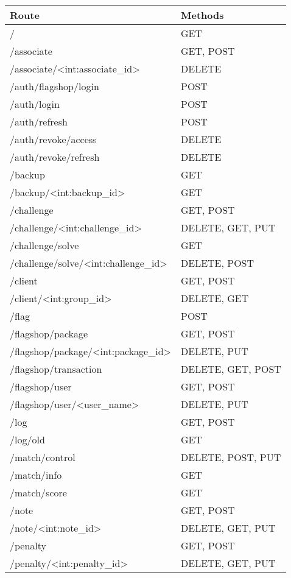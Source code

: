 \begin{table}
	\centering
	\begin{tabular}{l l}
		Route									 & Methods \\ [0.5ex]
		\hline
		/										 & GET \\
		/associate								 & GET, POST \\
		/associate/<int:associate\_id>			 & DELETE \\
		/auth/flagshop/login					 & POST \\
		/auth/login								 & POST \\
		/auth/refresh							 & POST \\
		/auth/revoke/access						 & DELETE \\
		/auth/revoke/refresh					 & DELETE \\
		/backup									 & GET \\
		/backup/<int:backup\_id>				 & GET \\
		/challenge								 & GET, POST \\
		/challenge/<int:challenge\_id>			 & DELETE, GET, PUT \\
		/challenge/solve						 & GET \\
		/challenge/solve/<int:challenge\_id>	 & DELETE, POST \\
		/client									 & GET, POST \\
		/client/<int:group\_id>					 & DELETE, GET \\
		/flag									 & POST \\
		/flagshop/package						 & GET, POST \\
		/flagshop/package/<int:package\_id>		 & DELETE, PUT \\
		/flagshop/transaction					 & DELETE, GET, POST \\
		/flagshop/user							 & GET, POST \\
		/flagshop/user/<user\_name>				 & DELETE, PUT \\
		/log									 & GET, POST \\
		/log/old								 & GET \\
		/match/control							 & DELETE, POST, PUT \\
		/match/info								 & GET \\
		/match/score							 & GET \\
		/note									 & GET, POST \\
		/note/<int:note\_id>					 & DELETE, GET, PUT \\
		/penalty								 & GET, POST \\
		/penalty/<int:penalty\_id>				 & DELETE, GET, PUT \\

\end{tabular}
\end{table}
